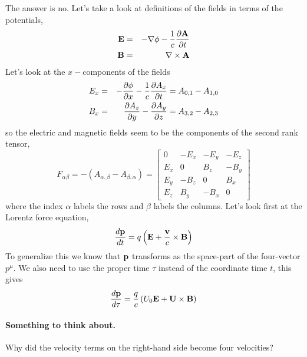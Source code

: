 The answer is no.   Let's take a look at definitions of the 
fields in terms of the potentials,
\begin{eqnarray}
{\bf E} &=&  - \nabla \phi -\frac{1}{c} \frac{\partial {\bf A}}{\partial {t}} \\
{\bf B} &=& \nabla \times {\bf A}
\label{eq:304}
\end{eqnarray}
Let's look at the $x-$components of the fields 
\begin{eqnarray}
E_x &=& - \frac{\partial {\phi}}{\partial {x}} -\frac{1}{c} \frac{\partial {A_x}}{\partial {t}} = A_{0,1} - A_{1,0} \\
B_x &=& \frac{\partial {A_z}}{\partial {y}} - \frac{\partial {A_y}}{\partial {z}} = A_{3,2} - A_{2,3} 
\label{eq:305}
\end{eqnarray}
so the electric and magnetic fields seem to be the components of the second rank tensor,
\begin{equation}
F_{\alpha\beta} = -\left ( A_{\alpha,\beta} - A_{\beta,\alpha} \right ) = \left [
\begin{array}{cccc} 
0   & -E_x & -E_y & -E_z \\
E_x &    0 &  B_z &  -B_y \\
E_y & -B_z &   0  &  B_x \\
E_z &  B_y &  -B_x &  0
\end{array}
\right ] 
\label{eq:306}
\end{equation}
where the index $\alpha$ labels the rows and $\beta$ labels the columns.
Let's look first at the Lorentz force equation,
\begin{equation}
\frac{d {\bf p}}{d {t}} = q \left ( {\bf E} + \frac{\bf v}{c} \times {\bf B} \right )
\label{eq:307}
\end{equation}
To generalize this we know that ${\bf p}$ transforms as the space-part
of the four-vector $p^\mu$.  We also need to use the proper time $\tau$ instead of the 
coordinate time $t$, this gives
\begin{equation}
\frac{d {\bf p}}{d {\tau}} = \frac{q}{c} \left ( U_0 {\bf E} + {\bf U} \times {\bf B} \right )
\label{eq:308}
\end{equation}

\paragraph{Something to think about.}
Why did the velocity terms on the right-hand side become four velocities?

